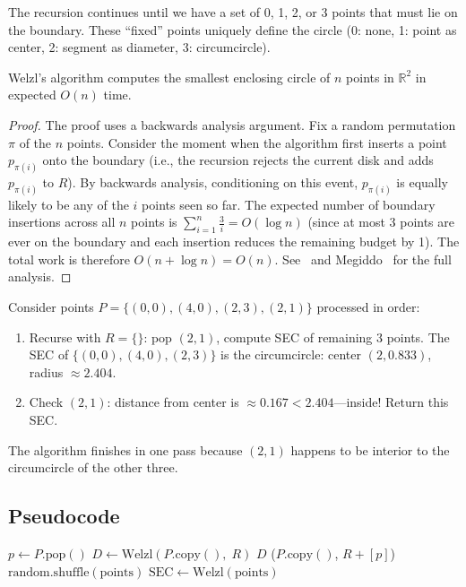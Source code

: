 The recursion continues until we have a set of 0, 1, 2, or 3 points that must lie on the boundary. These ``fixed'' points uniquely define the circle (0: none, 1: point as center, 2: segment as diameter, 3: circumcircle).

\begin{theorem}\label{thm:welzl_linear}
Welzl's algorithm computes the smallest enclosing circle of $n$ points in $\mathbb{R}^2$ in expected $O(n)$ time.
\end{theorem}

\begin{proof}
The proof uses a backwards analysis argument. Fix a random permutation $\pi$ of the $n$ points. Consider the moment when the algorithm first inserts a point $p_{\pi(i)}$ onto the boundary (i.e., the recursion rejects the current disk and adds $p_{\pi(i)}$ to $R$). By backwards analysis, conditioning on this event, $p_{\pi(i)}$ is equally likely to be any of the $i$ points seen so far. The expected number of boundary insertions across all $n$ points is $\sum_{i=1}^{n} \frac{3}{i} = O(\log n)$ (since at most 3 points are ever on the boundary and each insertion reduces the remaining budget by 1). The total work is therefore $O(n + \log n) = O(n)$. See~\cite{welzl1991} and Megiddo~\cite{megiddo1983} for the full analysis.
\end{proof}



\begin{example}\label{ex:welzl}
Consider points $P = \{(0,0), (4,0), (2,3), (2,1)\}$ processed in order:
\begin{enumerate}
    \item Recurse with $R = \{\}$: pop $(2,1)$, compute SEC of remaining 3 points. The SEC of $\{(0,0),(4,0),(2,3)\}$ is the circumcircle: center $(2, 0.833)$, radius $\approx 2.404$.
    \item Check $(2,1)$: distance from center is $\approx 0.167 < 2.404$---inside! Return this SEC.
\end{enumerate}
The algorithm finishes in one pass because $(2,1)$ happens to be interior to the circumcircle of the other three.
\end{example}

\subsection{Pseudocode}
\begin{algorithm}[ht]
\label{alg:welzl}
\begin{algorithmic}[1]
        \State \Return {}
    \EndIf
    \State $p \gets P.\text{pop}()$
    \State $D \gets \text{Welzl}(P.\text{copy}(),\; R)$
        \State \Return $D$
    \EndIf
    \State \Return {}($P.\text{copy}()$, $R + [p]$)
\EndFunction
\Statex
{}
\State $\text{random.shuffle}(\text{points})$
\State $\text{SEC} \gets \text{Welzl}(\text{points})$
\end{algorithmic}
\end{algorithm}


